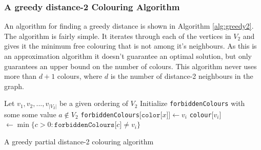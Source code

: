 	\subsubsection{A greedy distance-2 Colouring Algorithm}
	An algorithm for finding a greedy distance is shown in Algorithm
	\ref{alg:greedy2}. The algorithm is fairly simple. It iterates through each of the vertices 
	in $V_2$ and gives it the minimum free colouring that is not among it's 
	neighbours. As this is an approximation algorithm it doesn't guarantee an optimal 
	solution, but only guarantees an upper bound on the number of colours. This algorithm never uses
	more than $d+1$ colours, where $d$ is the number of distance-2 neighbours in the graph. 
	\newline
	\begin{algorithm}[H]
		\SetAlgoLined
		Let $v_1, v_2, ..., v_{\vert V_2 \vert}$ be a given ordering of $V_2$\;
		Initialize \texttt{forbiddenColours} with some some value $a \not\in V_2$\;
		{
			{
				{
					\texttt{forbiddenColours}$\lbrack \texttt{color} \lbrack x \rbrack \rbrack
					\leftarrow v_i$
				}
			}
			\texttt{colour}$\lbrack v_i \rbrack$ $\leftarrow \min \{ c > 0 :
			\texttt{forbiddenColours}\lbrack c \rbrack \not= v_i \}$
		}
		\caption{A greedy partial distance-2 colouring algorithm}
		\label{alg:greedy2}
	\end{algorithm}
 


